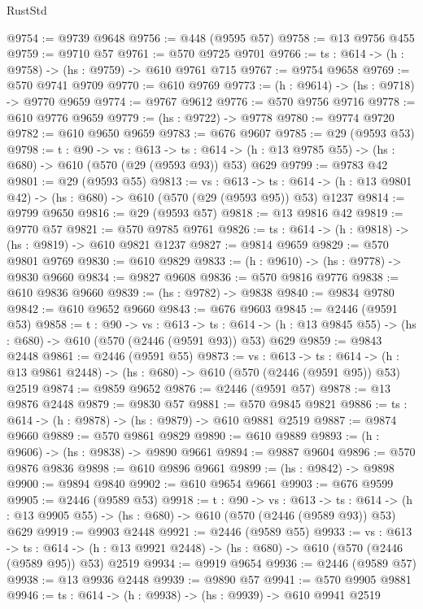 \begin{lexlean}{RustStd}
\begin{coremodule}
@9754 := @9739 @9648
@9756 := @448 (@9595 @57)
@9758 := @13 @9756 @455
@9759 := @9710 @57
@9761 := @570 @9725 @9701
@9766 := {ts : @614} -> (h : @9758) -> (hs : @9759) -> @610 @9761 @715
@9767 := @9754 @9658
@9769 := @570 @9741 @9709
@9770 := @610 @9769
@9773 := (h : @9614) -> (hs : @9718) -> @9770 @9659
@9774 := @9767 @9612
@9776 := @570 @9756 @9716
@9778 := @610 @9776 @9659
@9779 := (hs : @9722) -> @9778
@9780 := @9774 @9720
@9782 := @610 @9650 @9659
@9783 := @676 @9607
@9785 := @29 (@9593 @53)
@9798 := {t : @90} ->
  {vs : @613} ->
  {ts : @614} -> (h : @13 @9785 @55) -> (hs : @680) -> @610 (@570 (@29 (@9593 @93)) @53) @629
@9799 := @9783 @42
@9801 := @29 (@9593 @55)
@9813 := {vs : @613} ->
  {ts : @614} -> (h : @13 @9801 @42) -> (hs : @680) -> @610 (@570 (@29 (@9593 @95)) @53) @1237
@9814 := @9799 @9650
@9816 := @29 (@9593 @57)
@9818 := @13 @9816 @42
@9819 := @9770 @57
@9821 := @570 @9785 @9761
@9826 := {ts : @614} -> (h : @9818) -> (hs : @9819) -> @610 @9821 @1237
@9827 := @9814 @9659
@9829 := @570 @9801 @9769
@9830 := @610 @9829
@9833 := (h : @9610) -> (hs : @9778) -> @9830 @9660
@9834 := @9827 @9608
@9836 := @570 @9816 @9776
@9838 := @610 @9836 @9660
@9839 := (hs : @9782) -> @9838
@9840 := @9834 @9780
@9842 := @610 @9652 @9660
@9843 := @676 @9603
@9845 := @2446 (@9591 @53)
@9858 := {t : @90} ->
  {vs : @613} ->
  {ts : @614} -> (h : @13 @9845 @55) -> (hs : @680) -> @610 (@570 (@2446 (@9591 @93)) @53) @629
@9859 := @9843 @2448
@9861 := @2446 (@9591 @55)
@9873 := {vs : @613} ->
  {ts : @614} -> (h : @13 @9861 @2448) -> (hs : @680) -> @610 (@570 (@2446 (@9591 @95)) @53) @2519
@9874 := @9859 @9652
@9876 := @2446 (@9591 @57)
@9878 := @13 @9876 @2448
@9879 := @9830 @57
@9881 := @570 @9845 @9821
@9886 := {ts : @614} -> (h : @9878) -> (hs : @9879) -> @610 @9881 @2519
@9887 := @9874 @9660
@9889 := @570 @9861 @9829
@9890 := @610 @9889
@9893 := (h : @9606) -> (hs : @9838) -> @9890 @9661
@9894 := @9887 @9604
@9896 := @570 @9876 @9836
@9898 := @610 @9896 @9661
@9899 := (hs : @9842) -> @9898
@9900 := @9894 @9840
@9902 := @610 @9654 @9661
@9903 := @676 @9599
@9905 := @2446 (@9589 @53)
@9918 := {t : @90} ->
  {vs : @613} ->
  {ts : @614} -> (h : @13 @9905 @55) -> (hs : @680) -> @610 (@570 (@2446 (@9589 @93)) @53) @629
@9919 := @9903 @2448
@9921 := @2446 (@9589 @55)
@9933 := {vs : @613} ->
  {ts : @614} -> (h : @13 @9921 @2448) -> (hs : @680) -> @610 (@570 (@2446 (@9589 @95)) @53) @2519
@9934 := @9919 @9654
@9936 := @2446 (@9589 @57)
@9938 := @13 @9936 @2448
@9939 := @9890 @57
@9941 := @570 @9905 @9881
@9946 := {ts : @614} -> (h : @9938) -> (hs : @9939) -> @610 @9941 @2519

\end{coremodule}
\end{lexlean}
